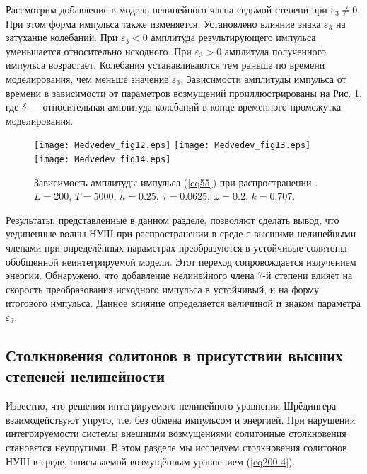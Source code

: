 \documentclass[12pt,a4paper]{article}
\begin{document}
	Рассмотрим добавление в модель нелинейного члена седьмой степени при \(\varepsilon_{3}\ne0\). При этом форма импульса также изменяется. Установлено влияние знака \(\varepsilon_{3}\) на затухание колебаний. При \(\varepsilon _{3}<0\) амплитуда результирующего импульса уменьшается относительно исходного. При \(\varepsilon _{3}>0\) амплитуда полученного импульса возрастает. Колебания устанавливаются тем раньше по времени моделирования, чем меньше значение \(\varepsilon_{3}\). Зависимости амплитуды импульса от времени в зависимости от параметров возмущений проиллюстрированы на Рис. \ref{fig48}, где \(\delta\) — относительная амплитуда колебаний в конце временного промежутка моделирования.
	\begin{figure}[H] %
		\begin{minipage}[h]{1\linewidth}
			\texttt{[image: Medvedev\_fig12.eps]}
			\texttt{[image: Medvedev\_fig13.eps]}
			\texttt{[image: Medvedev\_fig14.eps]}
		\end{minipage}
		\caption{Зависимость амплитуды импульса (\ref{eq55}) при распространении .
		\(L=200,\, T=5000,\, h=0.25,\, \tau=0.0625,\, \omega=0.2,\, k=0.707\).}
		\label{fig48}
	\end{figure}

	Результаты, представленные в данном разделе, позволяют сделать вывод, что уединенные волны НУШ при распространении в среде с высшими нелинейными членами при определённых параметрах преобразуются в устойчивые солитоны обобщенной неинтегрируемой модели. Этот переход сопровождается излучением энергии. Обнаружено, что добавление нелинейного члена 7-й степени влияет на скорость преобразования исходного импульса в устойчивый, и на форму итогового импульса. Данное влияние определяется величиной и знаком параметра \(\varepsilon_{3}\).
\subsection{Столкновения солитонов в присутствии высших степеней нелинейности}\label{ch340}
	Известно, что решения интегрируемого нелинейного уравнения Шрёдингера взаимодействуют упруго, т.е. без обмена импульсом и энергией. При нарушении интегрируемости системы внешними возмущениями солитонные столкновения становятся неупругими. В этом разделе мы исследуем столкновения солитонов НУШ в среде, описываемой возмущённым уравнением (\ref{eq200-4}).
\end{document}
